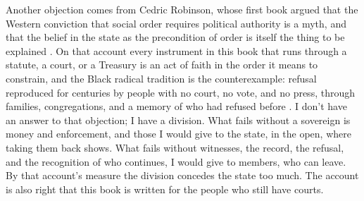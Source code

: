 Another objection comes from Cedric Robinson, whose first book argued that the Western conviction that social order requires political authority is a myth, and that the belief in the state as the precondition of order is itself the thing to be explained \autocite{robinson1980terms}. On that account every instrument in this book that runs through a statute, a court, or a Treasury is an act of faith in the order it means to constrain, and the Black radical tradition is the counterexample: refusal reproduced for centuries by people with no court, no vote, and no press, through families, congregations, and a memory of who had refused before \autocite{robinson2000black}. I don't have an answer to that objection; I have a division. What fails without a sovereign is money and enforcement, and those I would give to the state, in the open, where taking them back shows. What fails without witnesses, the record, the refusal, and the recognition of who continues, I would give to members, who can leave. By that account's measure the division concedes the state too much. The account is also right that this book is written for the people who still have courts.


